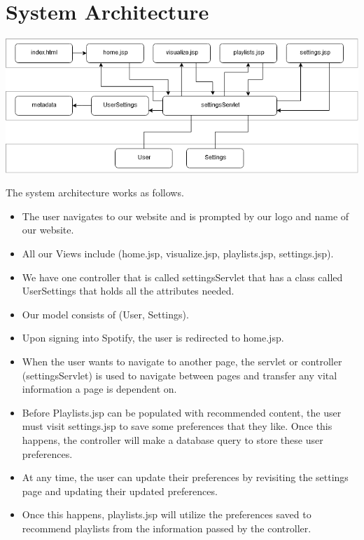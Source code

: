\documentclass[letter, 11pt]{article}
\begin{document}
\section*{System Architecture}

\includegraphics[scale=0.64,left]{er_tables/mvc.png}

The system architecture works as follows.
\begin{itemize}
    \item The user navigates to our website and is prompted by our logo and name of our website.
    \item All our Views include (home.jsp, visualize.jsp, playlists.jsp, settings.jsp).
    \item We have one controller that is called settingsServlet that has a class called UserSettings that holds all the attributes needed.
    \item Our model consists of (User, Settings).
    \item Upon signing into Spotify, the user is redirected to home.jsp.
    \item When the user wants to navigate to another page, the servlet or controller (settingsServlet) is used to navigate between pages and transfer any vital information a page is dependent on.
    \item Before Playlists.jsp can be populated with recommended content, the user must visit settings.jsp to save some preferences that they like. Once this happens, the controller will make a database query to store these user preferences.
    \item At any time, the user can update their preferences by revisiting the settings page and updating their updated preferences.
    \item Once this happens, playlists.jsp will utilize the preferences saved to recommend playlists from the information passed by the controller.
\end{itemize}
\end{document}
